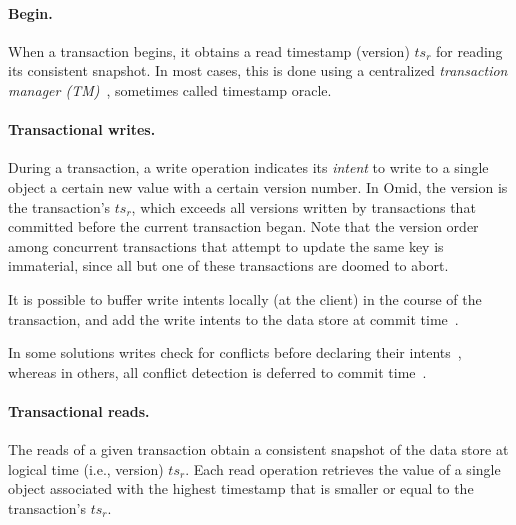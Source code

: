 \paragraph{Begin.} 
  When a transaction begins, it obtains a read timestamp (version) $ts_r$ for reading its consistent snapshot.
 In most cases, this is done using a centralized \emph{transaction manager (TM)}~\cite{Percolator2010,OmidICDE2014,Omid2017,tephra},
 sometimes called timestamp oracle. 

\paragraph{Transactional writes.} 
 During a transaction, a write operation indicates its \emph{intent} to write to a single object a certain new value with a certain version number.
In Omid, the version is the transaction's $ts_r$, which exceeds all versions written by transactions that committed before the
current transaction began. Note that the version order among concurrent transactions that  attempt to update the same key is immaterial, 
since all but one of these transactions are doomed to abort. 

It is possible to buffer write intents locally (at the client) in the course of the transaction, and add the write intents to the data store at commit time~\cite{Percolator2010}.

In some solutions writes check for conflicts before declaring their intents~\cite{cockroach}, whereas in others, 
all conflict detection is deferred to commit time~\cite{Percolator2010,OmidICDE2014,Omid2017,tephra}. 

\paragraph{Transactional reads.} 
The reads of a given transaction obtain a consistent snapshot of the data store at logical time (i.e., version) $ts_r$.
Each read operation retrieves the value of a single object associated with the highest timestamp that is 
smaller or equal to the transaction's $ts_r$. 

